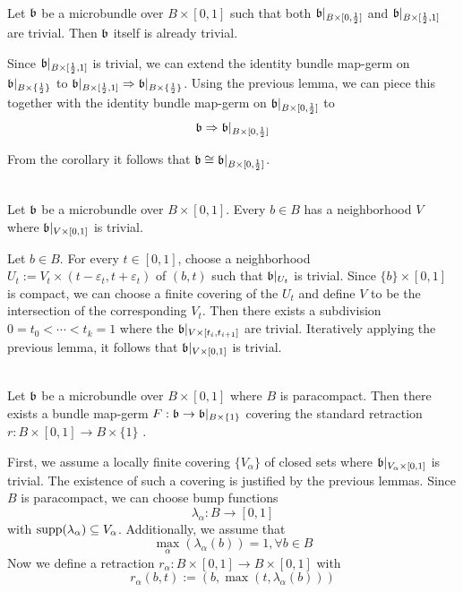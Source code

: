 \begin{file}
\newcommand{\A}[1][] {
    A_\alpha#1
}

\newcommand{\bbleft} {
    \bb\restr{B \times{} [0, \half]}
}
\newcommand{\bbright} {
    \bb\restr{B \times{} [\half, 1]}
}
\newcommand{\bbhalf} {
    \bb\restr{B \times{} \{ \half \}}
}

 \\
Let $\mathfrak{b}$ be a microbundle over $B \times [0, 1]$ such that both $\bbleft$ and $\bbright$ are trivial.
Then $\mathfrak{b}$ itself is already trivial.
\begin{myproof}
Since $\bbright$ is trivial, we can extend the identity bundle map-germ on $\bbhalf$ to $\bbright \double \bbhalf$.
Using the previous lemma, we can piece this together with the identity bundle map-germ on $\bbleft$ to
\[ \bb \double \bbleft \]

From the corollary it follows that $\bb \cong \bbleft$.
\end{myproof}

\lemma{\parttitle{}} \\
Let $\mathfrak{b}$ be a microbundle over $B \times [0, 1]$.
Every $b \in B$ has a neighborhood $V$ where $\mathfrak{b}\vert_{V \times [0, 1]}$ is trivial.
\begin{myproof}
Let $b \in B$.
For every $t \in [0, 1]$, choose a neighborhood $U_t := V_t \times (t - \varepsilon_t, t + \varepsilon_t)$ of $(b, t)$ such that $\mathfrak{b}\vert_{U_t}$ is trivial.
Since $\{b\} \times [0, 1]$ is compact, we can choose a finite covering of the $U_t$ and define $V$ to be the intersection of the corresponding $V_t$.
Then there exists a subdivision $0 = t_0 < \cdots < t_k = 1$ where the $\mathfrak{b}\vert_{V \times [t_{i}, t_{i + 1}]}$ are trivial.
Iteratively applying the previous lemma, it follows that $\mathfrak{b}\vert_{V \times [0, 1]}$ is trivial.
\end{myproof}

\lemma{\parttitle{}} \\
Let $\mathfrak{b}$ be a microbundle over $B \times [0, 1]$ where $B$ is paracompact.
Then there exists a bundle map-germ $F: \mathfrak{b} \to \mathfrak{b}\vert_{B \times \{1\}}$
covering the standard retraction $r: B \times [0, 1] \to B \times \{1\}$ .
\begin{myproof}
First, we assume a locally finite covering $\{V_\alpha\}$ of closed sets where $\mathfrak{b}\vert_{V_\alpha \times [0, 1]}$ is trivial.
The existence of such a covering is justified by the previous lemmas.
Since $B$ is paracompact, we can choose bump functions 
\[ \lambda_\alpha: B \to [0, 1] \]
with $\text{supp}(\lambda_\alpha) \subseteq{} V_\alpha$.
Additionally, we assume that 
\[ \max_{\alpha}(\lambda_\alpha(b)) = 1, \forall b \in B \]
Now we define a retraction $r_\alpha: B \times [0, 1] \to B \times [0, 1]$ with
\[ r_\alpha(b, t) := (b, \max(t, \lambda_\alpha(b))) \]


\end{myproof}
\end{file}
